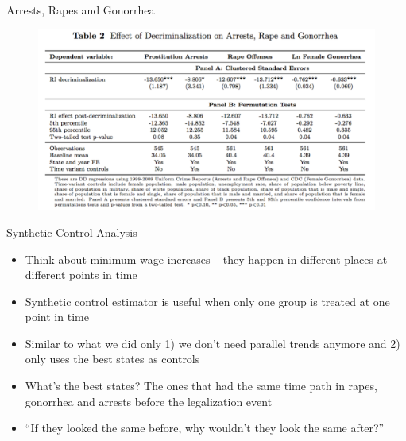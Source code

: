 \documentclass{beamer}
\begin{document}
\begin{frame}[shrink=20]{Arrests, Rapes and Gonorrhea}
	\begin{figure}
	\includegraphics[scale=0.35]{./lecture_includes/table2.pdf}
	\end{figure}
\end{frame}



\begin{frame}{Synthetic Control Analysis}\label{weights}
\begin{itemize}
\item Think about minimum wage increases -- they happen in different places at different points in time
\item Synthetic control estimator is useful when only one group is treated at one point in time
\item Similar to what we did only 1) we don't need parallel trends anymore and 2) only uses the best states as controls
\item What's the best states?  The ones that had the same time path in rapes, gonorrhea and arrests before the legalization event
\item ``If they looked the same before, why wouldn't they look the same after?''
\end{itemize}

\end{frame}
\end{document}
